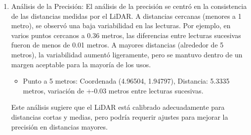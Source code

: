 \begin{enumerate}
            proceso de construcci\'on de una representaci\'on tridimensional coherente.
        \item An\'alisis de la Precisi\'on: El an\'alisis de la precisi\'on se centr\'o en la 
            consistencia de las distancias medidas por el LiDAR. A distancias cercanas (menores a 1 metro), 
            se observ\'o una baja variabilidad en las lecturas. Por ejemplo, en varios puntos cercanos 
            a 0.36 metros, las diferencias entre lecturas sucesivas fueron de menos de 0.01 metros. 
            A mayores distancias (alrededor de 5 metros), la variabilidad aument\'o ligeramente, 
            pero se mantuvo dentro de un margen aceptable para la mayor\'ia de los usos.
            \begin{itemize}
                \item Punto a 5 metros: Coordenada (4.96504, 1.94797), Distancia: 5.3335 metros, variaci\'on de +-0.03 metros entre lecturas sucesivas.
            \end{itemize}
            Este an\'alisis sugiere que el LiDAR est\'a calibrado adecuadamente para distancias cortas y medias, 
                pero podr\'ia requerir ajustes para mejorar la precisi\'on en distancias mayores.
    \end{enumerate}
